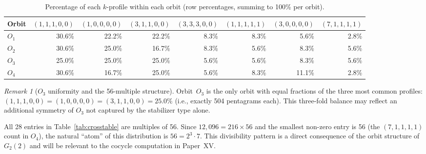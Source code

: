 \documentclass[11pt,a4paper]{article}
\theoremstyle{remark}
\newtheorem{remark}[theorem]{Remark}
\begin{document}
\begin{table}[H]
\centering
\caption{Percentage of each $k$-profile within each orbit
(row percentages, summing to 100\% per orbit).}
\label{tab:crosstable-pct}
\setlength{\tabcolsep}{4pt}
\begin{tabular}{lrrrrrrr}
\toprule
Orbit & $(1,1,1,0,0)$ & $(1,0,0,0,0)$ & $(3,1,1,0,0)$ & $(3,3,3,0,0)$
      & $(1,1,1,1,1)$ & $(3,0,0,0,0)$ & $(7,1,1,1,1)$ \\
\midrule
$O_1$ & 30.6\% & 22.2\% & 22.2\% & 8.3\% & 8.3\% & 5.6\% & 2.8\% \\
$O_2$ & 30.6\% & 25.0\% & 16.7\% & 8.3\% & 5.6\% & 8.3\% & 5.6\% \\
$O_3$ & 25.0\% & 25.0\% & 25.0\% & 5.6\% & 5.6\% & 8.3\% & 5.6\% \\
$O_4$ & 30.6\% & 16.7\% & 25.0\% & 5.6\% & 8.3\% & 11.1\% & 2.8\% \\
\bottomrule
\end{tabular}
\end{table}

\begin{remark}[$O_3$ uniformity and the 56-multiple structure]
Orbit~$O_3$ is the only orbit with equal fractions of the three most common
profiles: $(1,1,1,0,0) = (1,0,0,0,0) = (3,1,1,0,0) = 25.0\%$
(i.e., exactly 504 pentagrams each).
This three-fold balance may reflect an additional symmetry of $O_3$ not
captured by the stabilizer type alone.

All 28 entries in Table~\ref{tab:crosstable} are multiples of 56.
Since $12{,}096 = 216 \times 56$ and the smallest non-zero entry is 56
(the $(7,1,1,1,1)$ count in $O_4$), the natural ``atom'' of this
distribution is $56 = 2^3 \cdot 7$.
This divisibility pattern is a direct consequence of the orbit structure of
$G_2(2)$ and will be relevant to the cocycle computation in Paper~XV.
\end{remark}
\end{document}
